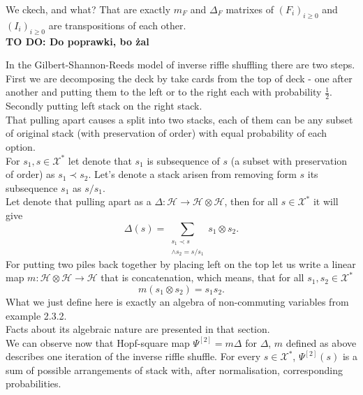 \documentclass[a4paper]{article}
\newcommand{\todo}[1]{\hfill \break \textbf{\Huge TO DO: #1 \hfill \break}\normalsize}
\begin{document}
We ckech, and what? That are exactly $m_F$ and $\Delta_F$ matrixes of $(F_i)_{i \geq 0}$ and $(I_i)_{i
\geq 0}$
are transpositions of each other.\\
\todo{Do poprawki, bo żal}

In the Gilbert-Shannon-Reeds model of inverse riffle shuffling there are two steps. First we are
decomposing the deck by take cards from the top of deck - one after another and putting them to the left
or to the right each with probability $\frac{1}{2}$. Secondly putting left stack on the right stack. \\
That pulling apart causes a split into two stacks, each of them can be any subset of original stack
(with preservation of order) with equal probability of each option. \\
For $s_1, s \in \mathcal{X}^*$ let denote that $s_1$ is subsequence of $s$ (a subset with preservation of
order) as $s_1 \prec s_2$. Let's denote a stack arisen from removing form $s$ its subsequence $s_1$ as
$s/s_1$. \\
Let denote that pulling apart as a $\Delta : \mathcal{H} \to \mathcal{H} \otimes \mathcal{H}$, then for all
$s \in \mathcal{X}^*$ it will give
\begin{equation*}
\Delta(s) = \sum_{\substack{s_1 \prec s \\ \land s_2 = s/s_1}}
s_1 \otimes s_2.
\end{equation*}
For putting two piles back together by placing left on the top let us write a linear map
$m : \mathcal{H} \otimes \mathcal{H} \to \mathcal{H}$ that is concatenation, which means, that
for all $s_1, s_2 \in \mathcal{X}^*$
\begin{equation*}
m(s_1 \otimes s_2) = s_1s_2.
\end{equation*}
What we just define here is exactly an algebra of non-commuting variables from example
2.3.2.\\
Facts about its algebraic nature are presented in that section. \\
We can observe now that Hopf-square map $\Psi^{[2]} = m\Delta$ for $\Delta$, $m$ defined as above
describes one iteration of the inverse riffle shuffle. For every $s \in \mathcal{X}^*$, $\Psi^{[2]}(s)$ is
a sum of possible arrangements of stack with, after normalisation, corresponding probabilities.
\end{document}
